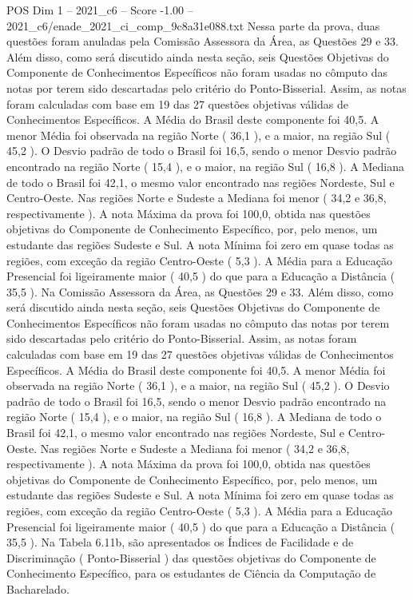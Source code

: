 \begin{textsample}{POS Dim 1 – 2021\_c6 – Score -1.00 – 2021\_c6/enade\_2021\_ci\_comp\_9c8a31e088.txt}
Nessa parte da prova, duas questões foram anuladas pela Comissão Assessora da Área, as Questões 29 e 33.
Além disso, como será discutido ainda nesta seção, seis Questões Objetivas do Componente de Conhecimentos Específicos não foram usadas no cômputo das notas por terem sido descartadas pelo critério do Ponto-Bisserial.
Assim, as notas foram calculadas com base em 19 das 27 questões objetivas válidas de Conhecimentos Específicos.
A Média do Brasil deste componente foi 40,5.
A menor Média foi observada na região Norte ( 36,1 ), e a maior, na região Sul ( 45,2 ).
O Desvio padrão de todo o Brasil foi 16,5, sendo o menor Desvio padrão encontrado na região Norte ( 15,4 ), e o maior, na região Sul ( 16,8 ).
A Mediana de todo o Brasil foi 42,1, o mesmo valor encontrado nas regiões Nordeste, Sul e Centro-Oeste.
Nas regiões Norte e Sudeste a Mediana foi menor ( 34,2 e 36,8, respectivamente ).
A nota Máxima da prova foi 100,0, obtida nas questões objetivas do Componente de Conhecimento Específico, por, pelo menos, um estudante das regiões Sudeste e Sul.
A nota Mínima foi zero em quase todas as regiões, com exceção da região Centro-Oeste ( 5,3 ).
A Média para a Educação Presencial foi ligeiramente maior ( 40,5 ) do que para a Educação a Distância ( 35,5 ).
Na Comissão Assessora da Área, as Questões 29 e 33.
Além disso, como será discutido ainda nesta seção, seis Questões Objetivas do Componente de Conhecimentos Específicos não foram usadas no cômputo das notas por terem sido descartadas pelo critério do Ponto-Bisserial.
Assim, as notas foram calculadas com base em 19 das 27 questões objetivas válidas de Conhecimentos Específicos.
A Média do Brasil deste componente foi 40,5.
A menor Média foi observada na região Norte ( 36,1 ), e a maior, na região Sul ( 45,2 ).
O Desvio padrão de todo o Brasil foi 16,5, sendo o menor Desvio padrão encontrado na região Norte ( 15,4 ), e o maior, na região Sul ( 16,8 ).
A Mediana de todo o Brasil foi 42,1, o mesmo valor encontrado nas regiões Nordeste, Sul e Centro-Oeste.
Nas regiões Norte e Sudeste a Mediana foi menor ( 34,2 e 36,8, respectivamente ).
A nota Máxima da prova foi 100,0, obtida nas questões objetivas do Componente de Conhecimento Específico, por, pelo menos, um estudante das regiões Sudeste e Sul.
A nota Mínima foi zero em quase todas as regiões, com exceção da região Centro-Oeste ( 5,3 ).
A Média para a Educação Presencial foi ligeiramente maior ( 40,5 ) do que para a Educação a Distância ( 35,5 ).
Na Tabela 6.11b, são apresentados os Índices de Facilidade e de Discriminação ( Ponto-Bisserial ) das questões objetivas do Componente de Conhecimento Específico, para os estudantes de Ciência da Computação de Bacharelado.

\end{textsample}
